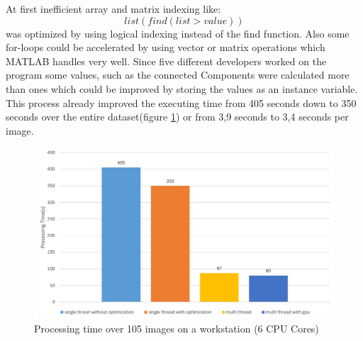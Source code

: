 \documentclass{article}
\begin{document}
At first inefficient array and matrix indexing like:
\[
list(find(list > value))
\]
was optimized by using logical indexing instead of the find function.
Also some for-loops could be accelerated by using vector or matrix operations which MATLAB handles very well.
Since five different developers worked on the program some values, such as the connected Components were calculated more than ones which could be improved by storing the values as an instance variable.
This process already improved the executing time from 405 seconds down to 350 seconds over the entire dataset(figure \ref{fig:OptWorkstation}) or from 3,9 seconds to 3,4 seconds per image.
\begin{figure}[!htbp]
	
      \includegraphics[width=1\linewidth]{OptWorkstation.png}

	\caption{Processing time over 105 images on a workstation (6 CPU Cores)} %
	\label{fig:OptWorkstation} 
\end{figure}
\end{document}

